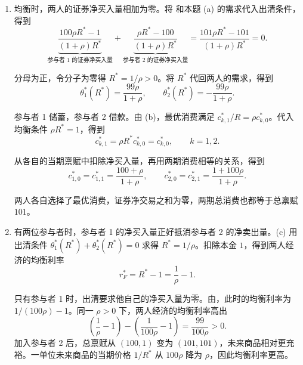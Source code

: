 \begin{solution}[blank-type=manual,blank-vsep=9\baselineskip]
\begin{enumerate}[label=(\alph*)]
    当 $R>1$ 时，$w_1-w_2>0$，所以参与者 1 的两期消费均较高。当 $R<1$ 时，$w_1-w_2<0$，所以参与者 2 的两期消费均较高。$R=1$ 时两人财富相等，两期消费也相同。

    再看储蓄和借款。两人的当期消费式为 $c_{1,0}=100-\theta_1$ 和 $c_{2,0}=1-\theta_2$。把最优当期消费代入这两式，解得净买入量
    \[
      \theta_1^*=100-c_{1,0}^*=\frac{100\rho R-1}{(1+\rho)R},\qquad
      \theta_2^*=1-c_{2,0}^*=\frac{\rho R-100}{(1+\rho)R}.
    \]

    净买入量为正表示储蓄，为负表示借款。两式的分母都为正，故
    \[
      \theta_1^*>0\iff R>\frac1{100\rho},\qquad
      \theta_2^*>0\iff R>\frac{100}{\rho}.
    \]

    当 $R$ 低于两个临界值时，两人都借款。高于两个临界值时，两人都储蓄。当 $1/(100\rho)<R<100/\rho$ 时，参与者 1 储蓄，参与者 2 借款。$R$ 恰好等于某人的临界值时，此人不交易。

    \item 均衡时，两人的证券净买入量相加为零。将 和本题 (a) 的需求代入出清条件，得到
    \[
        \underbrace{\frac{100\rho R^*-1}{(1+\rho)R^*}}_{\text{参与者 1 的证券净买入量}}
        +\underbrace{\frac{\rho R^*-100}{(1+\rho)R^*}}_{\text{参与者 2 的证券净买入量}}
        =\frac{101\rho R^*-101}{(1+\rho)R^*}=0.
    \]

    分母为正，令分子为零得 $R^*=1/\rho>0$。将 $R^*$ 代回两人的需求，得到
    \[
        \theta_1^*(R^*)=\frac{99\rho}{1+\rho},\qquad
        \theta_2^*(R^*)=-\frac{99\rho}{1+\rho}.
    \]

    参与者 1 储蓄，参与者 2 借款。由 (b)，最优消费满足 $c_{k,1}^*/R=\rho c_{k,0}^*$。代入均衡条件 $\rho R^*=1$，得到
    \[
        c_{k,1}^*=\rho R^*c_{k,0}^*=c_{k,0}^*,\qquad k=1,2.
    \]

    从各自的当期禀赋中扣除净买入量，再用两期消费相等的关系，得到
    \[
        c_{1,0}^*=c_{1,1}^*=\frac{100+\rho}{1+\rho},
        \qquad
        c_{2,0}^*=c_{2,1}^*=\frac{1+100\rho}{1+\rho}.
    \]

    两人各自选择了最优消费，证券净交易之和为零，两期总消费也都等于总禀赋 $101$。
    \item 有两位参与者时，参与者 1 的净买入量正好抵消参与者 2 的净卖出量。(c) 用出清条件 $\theta_1^*(R^*)+\theta_2^*(R^*)=0$ 求得 $R^*=1/\rho$。扣除本金 $1$，得到两人经济的均衡利率
    \[
      r_F^*=R^*-1=\frac{1}{\rho}-1.
    \]

    只有参与者 1 时，出清要求他自己的净买入量为零。由，此时的均衡利率为 $1/(100\rho)-1$。同一 $\rho>0$ 下，两人经济的均衡利率高出
    \[
      \left(\frac1\rho-1\right)-\left(\frac1{100\rho}-1\right)
      =\frac{99}{100\rho}>0.
    \]
    加入参与者 2 后，总禀赋从 $(100,1)$ 变为 $(101,101)$，未来商品相对更充裕。一单位未来商品的当期价格 $1/R^*$ 从 $100\rho$ 降为 $\rho$，因此均衡利率更高。


\end{enumerate}
\end{solution}

